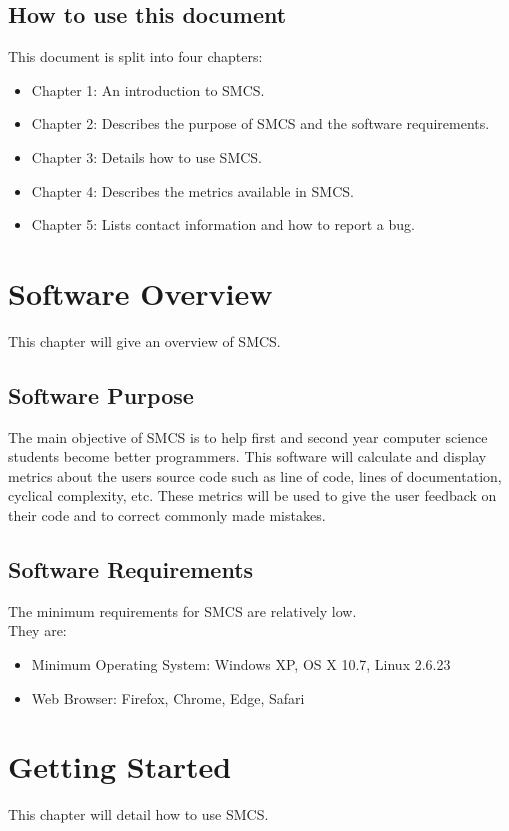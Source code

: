 \documentclass{scrreprt}
\begin{document}
	\section{How to use this document}
	This document is split into four chapters: 
	\begin{itemize}
		\item Chapter 1: An introduction to SMCS. 
		\item Chapter 2: Describes the purpose of SMCS and the software requirements. 
		\item Chapter 3: Details how to use SMCS. 
		\item Chapter 4: Describes the metrics available in SMCS. 
		\item Chapter 5: Lists contact information and how to report a bug.
	\end{itemize}
	
	{\let\clearpage\relax \chapter{Software Overview}}
	This chapter will give an overview of SMCS.
	
	\section{Software Purpose}
	The main objective of SMCS is to help first and second year computer science students become better programmers.
	This software will calculate and display metrics about the users source code such as line of code, lines of documentation, cyclical complexity, etc.
	These metrics will be used to give the user feedback on their code and to correct commonly made mistakes.

	\section{Software Requirements}
	The minimum requirements for SMCS are relatively low.\\
	They are:
	\begin{itemize}
		\item Minimum Operating System: Windows XP, OS X 10.7, Linux 2.6.23
		\item Web Browser: Firefox, Chrome, Edge, Safari
	\end{itemize}

	{\let\clearpage\relax \chapter{Getting Started}}
	This chapter will detail how to use SMCS.
	
\end{document}
